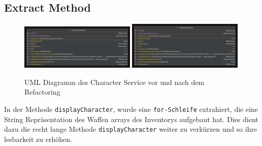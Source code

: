 \subsection{Extract Method}
\begin{figure}[H]
	\centering
	\includegraphics[width=0.49\textwidth]{Bilder/CharacterService.pdf}
	\includegraphics[width=0.49\textwidth]{Bilder/CharacterService-extracted.pdf}
	\caption{UML Diagramm des Character Service vor und nach dem Refactoring}
	\label{fig:extract}
\end{figure}
In der Methode \texttt{displayCharacter}, wurde eine \texttt{for-Schleife} extrahiert, die eine String Repräsentation des Waffen arrays des Inventorys aufgebaut hat. Dies dient dazu die recht lange Methode \texttt{displayCharacter} weiter zu verkürzen und so ihre lesbarkeit zu erhöhen.
